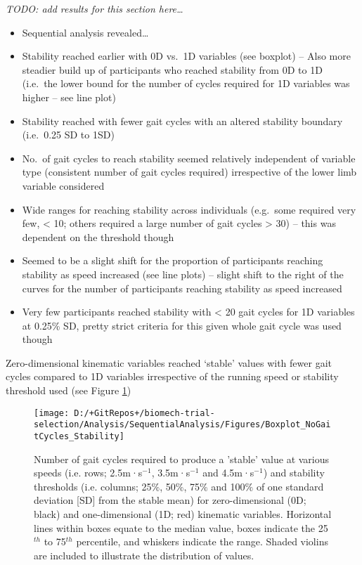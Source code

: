 \documentclass[]{elsarticle} %
\providecommand{\tightlist}{%
  \setlength{\itemsep}{0pt}\setlength{\parskip}{0pt}}
\begin{document}
\emph{TODO: add results for this section here\ldots{}}

\begin{itemize}
\tightlist
\item
  Sequential analysis revealed\ldots{}
\item
  Stability reached earlier with 0D vs.~1D variables (see boxplot) --
  Also more steadier build up of participants who reached stability from
  0D to 1D (i.e.~the lower bound for the number of cycles required for
  1D variables was higher -- see line plot)
\item
  Stability reached with fewer gait cycles with an altered stability
  boundary (i.e.~0.25 SD to 1SD)
\item
  No.~of gait cycles to reach stability seemed relatively independent of
  variable type (consistent number of gait cycles required) irrespective
  of the lower limb variable considered
\item
  Wide ranges for reaching stability across individuals (e.g.~some
  required very few, \textless{} 10; others required a large number of
  gait cycles \textgreater{} 30) -- this was dependent on the threshold
  though
\item
  Seemed to be a slight shift for the proportion of participants
  reaching stability as speed increased (see line plots) -- slight shift
  to the right of the curves for the number of participants reaching
  stability as speed increased
\item
  Very few participants reached stability with \textless{} 20 gait
  cycles for 1D variables at 0.25\% SD, pretty strict criteria for this
  given whole gait cycle was used though
\end{itemize}

Zero-dimensional kinematic variables reached `stable' values with fewer
gait cycles compared to 1D variables irrespective of the running speed
or stability threshold used (see Figure \ref{fig:boxplotStability})

\begin{figure}

{\centering \texttt{[image: D:/+GitRepos+/biomech-trial-selection/Analysis/SequentialAnalysis/Figures/Boxplot\_NoGaitCycles\_Stability]} 

}

\caption{Number of gait cycles required to produce a 'stable' value at various speeds (i.e. rows; 2.5m·s$^{-1}$, 3.5m·s$^{-1}$ and 4.5m·s$^{-1}$) and stability thresholds (i.e. columns; 25$\%$, 50$\%$, 75$\%$ and 100$\%$ of one standard deviation [SD] from the stable mean) for zero-dimensional (0D; black) and one-dimensional (1D; red) kinematic variables. Horizontal lines within boxes equate to the median value, boxes indicate the 25$^{th}$ to 75$^{th}$ percentile, and whiskers indicate the range. Shaded violins are included to illustrate the distribution of values.}\label{fig:boxplotStability}
\end{figure}
\end{document}
